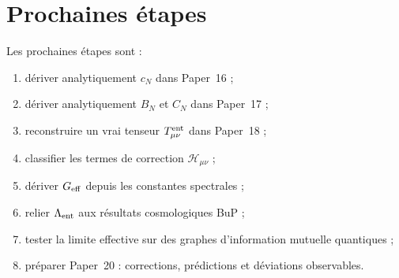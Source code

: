 \documentclass[11pt,a4paper]{article}
\begin{document}
\section{Prochaines étapes}

Les prochaines étapes sont :

\begin{enumerate}
    \item dériver analytiquement \(c_N\) dans Paper~16 ;
    \item dériver analytiquement \(B_N\) et \(C_N\) dans Paper~17 ;
    \item reconstruire un vrai tenseur \(T_{\mu\nu}^{\rm ent}\) dans Paper~18 ;
    \item classifier les termes de correction \(\mathcal{H}_{\mu\nu}\) ;
    \item dériver \(G_{\rm eff}\) depuis les constantes spectrales ;
    \item relier \(\Lambda_{\rm ent}\) aux résultats cosmologiques BuP ;
    \item tester la limite effective sur des graphes d'information mutuelle quantiques ;
    \item préparer Paper~20 : corrections, prédictions et déviations observables.
\end{enumerate}
\end{document}
